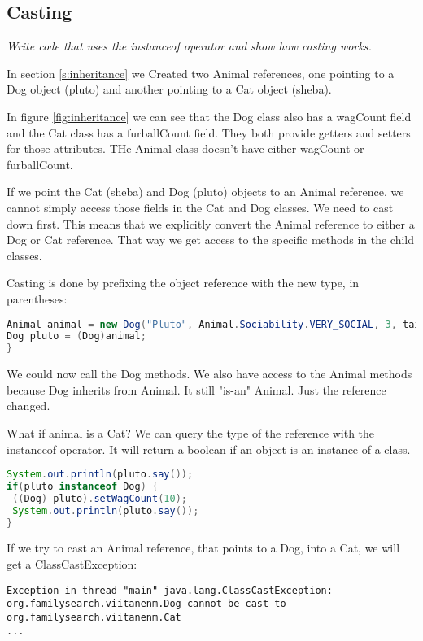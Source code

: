 \subsection{Casting}
\textit{Write code that uses the instanceof operator and show how casting works.}

In section \ref{s:inheritance} we Created two Animal references, one pointing to a Dog object (pluto) and another pointing to a Cat object (sheba).

In figure \ref{fig:inheritance} we can see that the Dog class also has a wagCount field and the Cat class has a furballCount field. They both provide getters and setters for those attributes. THe Animal class doesn't have either wagCount or furballCount.

If we point the Cat (sheba) and Dog (pluto) objects to an Animal reference, we cannot simply access those fields in the Cat and Dog classes. We need to cast down first. This means that we explicitly convert the Animal reference to either a Dog or Cat reference. That way we get access to the specific methods in the child classes.

Casting is done by prefixing the object reference with the new type, in parentheses: 

\begin{lstlisting}[language=Java]
Animal animal = new Dog("Pluto", Animal.Sociability.VERY_SOCIAL, 3, tail);
Dog pluto = (Dog)animal;
}
\end{lstlisting}

We could now call the Dog methods. We also have access to the Animal methods because Dog inherits from Animal. It still "is-an" Animal. Just the reference changed.

What if animal is a Cat? We can query the type of the reference with the instanceof operator. It will return a boolean if an object is an instance of a class.

\begin{lstlisting}[language=Java]
System.out.println(pluto.say());
if(pluto instanceof Dog) {
 ((Dog) pluto).setWagCount(10);
 System.out.println(pluto.say());
}
\end{lstlisting}

If we try to cast an Animal reference, that points to a Dog, into a Cat, we will get a ClassCastException:
\begin{lstlisting}
Exception in thread "main" java.lang.ClassCastException: org.familysearch.viitanenm.Dog cannot be cast to org.familysearch.viitanenm.Cat
...
\end{lstlisting}

